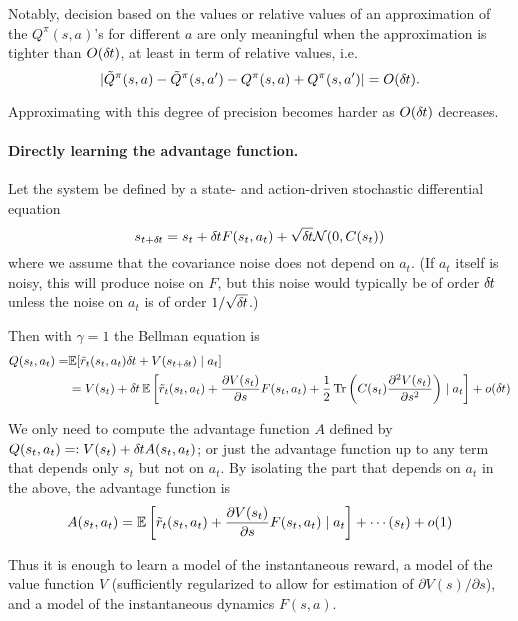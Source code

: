 Notably, decision based on the values or relative values of an approximation of
the $Q^\pi(s, a)$'s for different $a$ are only meaningful when the
approximation is tighter than $O (\delta\hspace{-.06em}t)$, at least in term of relative
values, i.e.  
\begin{equation*}
	|\tilde{Q}^\pi(s, a) - \tilde{Q}^\pi(s, a') - Q^\pi(s, a) +
	Q^\pi(s, a')| = O (\delta\hspace{-.06em}t).
\end{equation*}

Approximating with this degree of precision becomes harder as $O (\delta\hspace{-.06em}t)$
decreases. 

\paragraph{Directly learning the advantage function.}
Let the system be defined by a state- and action-driven stochastic
differential equation
\begin{equation}
s_{t+\delta\hspace{-.06em}t}=s_t+\delta\hspace{-.06em}t F(s_t,a_t)+\sqrt{\delta\hspace{-.06em}t}\mathcal{N}(0,C(s_t))
\end{equation}
where we assume that the covariance noise does not depend on $a_t$. (If
$a_t$ itself is noisy, this will produce noise on $F$, but this noise
would typically be of order $\delta\hspace{-.06em}t$ unless the noise on $a_t$ is of
order $1/\sqrt{\delta\hspace{-.06em}t}$.)

Then with $\gamma=1$ the Bellman equation is
\begin{align}
Q(s_t,a_t)=&\mathbb{E}[ \tilde{r}_t(s_t,a_t) \delta\hspace{-.06em}t + V(s_{t+\delta\hspace{-.06em}t}) \mid a_t]
\\&=V(s_t)+\delta\hspace{-.06em}t \,\mathbb{E}\left[\tilde{r}_t(s_t,a_t)+\frac{\partial V(s_t)}{\partial
s}F(s_t,a_t)+\frac12 \operatorname{Tr} \left(C(s_t)\frac{\partial^2 V(s_t)}{\partial
s^2}\right)\mid a_t\right]+o(\delta\hspace{-.06em}t)
\end{align}

We only need to compute the advantage function $A$ defined by
$Q(s_t,a_t)=\mathrel{\mathop{:}} V(s_t)+\delta\hspace{-.06em}t A(s_t,a_t)$; or just the advantage function
up to any term that depends only $s_t$ but not on $a_t$. By isolating the
part that
depends on $a_t$ in the above, the advantage function is
\begin{equation}
A(s_t,a_t)=\mathbb{E}\left[\tilde{r}_t(s_t,a_t)+\frac{\partial
V(s_t)}{\partial
s}F(s_t,a_t)\mid a_t\right]+\cdots(s_t)+o(1)
\end{equation}

Thus it is enough to learn a model of the instantaneous reward, a model
of the value function $V$ (sufficiently regularized to allow for
estimation of $\partial V(s)/\partial s$), and a model of the
instantaneous dynamics $F(s,a)$.
